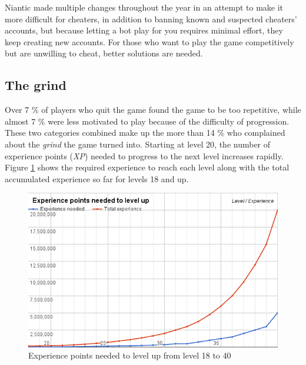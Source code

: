 Niantic made multiple changes throughout the year in an attempt to make it more difficult for cheaters, in addition to banning known and suspected cheaters' accounts, but because letting a bot play for you requires minimal effort, they keep creating new accounts. For those who want to play the game competitively but are unwilling to cheat, better solutions are needed. 

\subsection{The grind}
\label{sec:quitting-reasons-the-grind}
Over 7 \% of players who quit the game found the game to be too repetitive, while almost 7 \% were less motivated to play because of the difficulty of progression. These two categories combined make up the more than 14 \% who complained about the \emph{grind}  the game turned into. Starting at level 20, the number of experience points (\emph{XP}) needed to progress to the next level increases rapidly. Figure \ref{fig:experience-per-level} shows the required experience to reach each level along with the total accumulated experience so far for levels 18 and up.

\begin{figure}[h]
	\centering
	\includegraphics[width=\textwidth]{Figures/experience-per-level}
	\caption{Experience points needed to level up from level 18 to 40}
	\label{fig:experience-per-level}
\end{figure}

